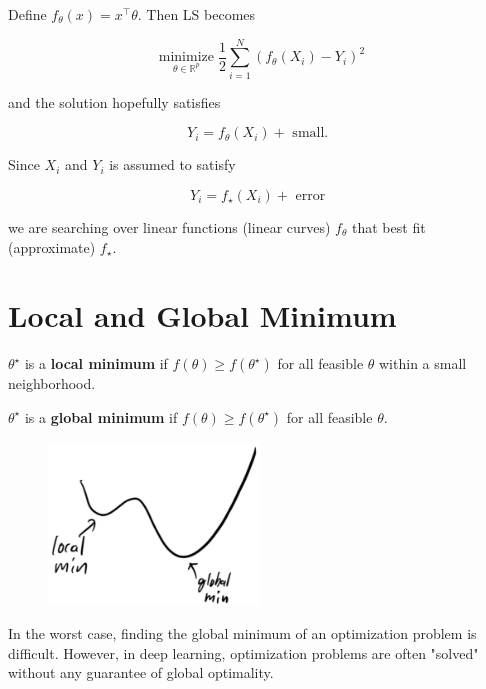 \documentclass{report}
\begin{document}
\begin{concept}
    Define $f_{\theta}(x)=x^{\top} \theta$.
    Then LS becomes

    $$
    \underset{\theta \in \mathbb{R}^{p}}{\operatorname{minimize}} \frac{1}{2} \sum_{i=1}^{N}\left(f_{\theta}\left(X_{i}\right)-Y_{i}\right)^{2}
    $$

    and the solution hopefully satisfies

    $$
    Y_{i}=f_{\theta}\left(X_{i}\right)+\text { small. }
    $$

    Since $X_{i}$ and $Y_{i}$ is assumed to satisfy

    $$
    Y_{i}=f_{\star}\left(X_{i}\right)+\text { error }
    $$

    we are searching over linear functions (linear curves) $f_{\theta}$ that best fit (approximate) $f_{\star}$.
\end{concept}

\section{Local and Global Minimum}

\begin{definition}
    $\theta^{\star}$ is a \textbf{local minimum} if $f(\theta) \geq f\left(\theta^{\star}\right)$ for all feasible $\theta$ within a small neighborhood.

    $\theta^{\star}$ is a \textbf{global minimum} if $f(\theta) \geq f\left(\theta^{\star}\right)$ for all feasible $\theta$.

    \begin{figure}[H]
        \centering
        \includegraphics[width=0.5\textwidth]{.././assets/1.1.jpg}
    \end{figure}

    In the worst case, finding the global minimum of an optimization problem is difficult.
    However, in deep learning, optimization problems are often "solved" without any guarantee of global optimality.
\end{definition}
\end{document}
